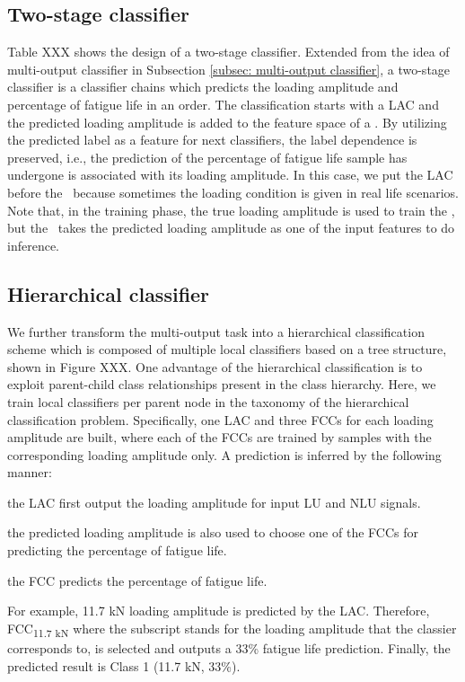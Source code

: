 \subsection{Two-stage classifier}
Table XXX shows the design of a two-stage classifier. Extended from the idea of multi-output classifier in Subsection \ref{subsec: multi-output classifier}, a two-stage classifier is a classifier chains which predicts the loading amplitude and percentage of fatigue life in an order. The classification starts with a LAC and the predicted loading amplitude is added to the feature space of a \fcctwo. By utilizing the predicted label as a feature for next classifiers, the label dependence is preserved, i.e., the prediction of the percentage of fatigue life sample has undergone is associated with its loading amplitude. In this case, we put the LAC before the \fcctwo \  because sometimes the loading condition is given in real life scenarios. Note that, in the training phase, the true loading amplitude is used to train the \fcctwo, but the \fcctwo \ takes the predicted loading amplitude as one of the input features to do inference.

\subsection{Hierarchical classifier}
We further transform the multi-output task into a hierarchical classification scheme which is composed of multiple local classifiers based on a tree structure, shown in Figure XXX. One advantage of the hierarchical classification is to exploit parent-child class relationships present in the class hierarchy. Here, we train local classifiers per parent node in the taxonomy of the hierarchical classification problem. Specifically, one LAC and three FCCs for each loading amplitude are built, where each of the FCCs are trained by samples with the corresponding loading amplitude only. A prediction is inferred by the following manner: 
\begin{enumerate*}[label=\itshape\alph*\upshape)]
    \item the LAC first output the loading amplitude for input LU and NLU signals.
    \item the predicted loading amplitude is also used to choose one of the FCCs for predicting the percentage of fatigue life.
    \item the FCC predicts the percentage of fatigue life.
\end{enumerate*}
For example, 11.7 kN loading amplitude is predicted by the LAC. Therefore, FCC\textsubscript{11.7 kN} where the subscript stands for the loading amplitude that the classier corresponds to, is selected and outputs a 33\% fatigue life prediction. Finally, the predicted result is Class 1 (11.7 kN, 33\%).

